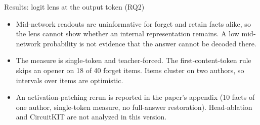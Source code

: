 \documentclass[aspectratio=169,11pt,usepdftitle=false]{beamer}
\begin{document}
\begin{frame}{Results: logit lens at the output token (RQ2)}
{\begin{itemize}
\item Mid-network readouts are uninformative for forget and retain facts alike, so the lens cannot show whether an internal representation remains. A low mid-network probability is not evidence that the answer cannot be decoded there.
\item The measure is single-token and teacher-forced. The first-content-token rule skips an opener on 18 of 40 forget items. Items cluster on two authors, so intervals over items are optimistic.
\item An activation-patching rerun is reported in the paper's appendix (10 facts of one author, single-token measure, no full-answer restoration). Head-ablation and CircuitKIT are not analyzed in this version.
\end{itemize}}
\end{frame}
\end{document}
